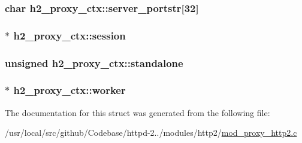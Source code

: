 \subsubsection[{\texorpdfstring{server\+\_\+portstr}{server_portstr}}]{\setlength{\rightskip}{0pt plus 5cm}char h2\+\_\+proxy\+\_\+ctx\+::server\+\_\+portstr\mbox{[}32\mbox{]}}\hypertarget{structh2__proxy__ctx_a7d8e0a31ba98c520a010df3a46f08b93}{}\label{structh2__proxy__ctx_a7d8e0a31ba98c520a010df3a46f08b93}
\subsubsection[{\texorpdfstring{session}{session}}]{$\ast$ h2\+\_\+proxy\+\_\+ctx\+::session}\hypertarget{structh2__proxy__ctx_a53285981382ef1b2a528424f6b268adc}{}\label{structh2__proxy__ctx_a53285981382ef1b2a528424f6b268adc}
\subsubsection[{\texorpdfstring{standalone}{standalone}}]{\setlength{\rightskip}{0pt plus 5cm}unsigned h2\+\_\+proxy\+\_\+ctx\+::standalone}\hypertarget{structh2__proxy__ctx_ab5108d32dbd7866d57f9e656e5dee3c8}{}\label{structh2__proxy__ctx_ab5108d32dbd7866d57f9e656e5dee3c8}
\subsubsection[{\texorpdfstring{worker}{worker}}]{$\ast$ h2\+\_\+proxy\+\_\+ctx\+::worker}\hypertarget{structh2__proxy__ctx_a5174b4cd727543cff4c868fd58f36436}{}\label{structh2__proxy__ctx_a5174b4cd727543cff4c868fd58f36436}


The documentation for this struct was generated from the following file\+:\begin{DoxyCompactItemize}
\item 
/usr/local/src/github/\+Codebase/httpd-\/2../modules/http2/\hyperlink{mod__proxy__http2_8c}{mod\+\_\+proxy\+\_\+http2.\+c}\end{DoxyCompactItemize}
